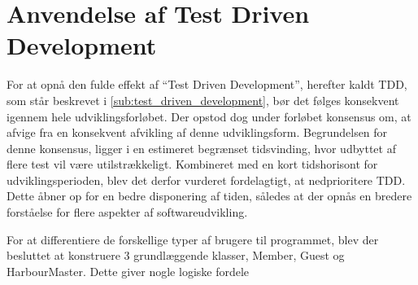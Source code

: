 \section{Anvendelse af Test Driven Development}

For at opnå den fulde effekt af \enquote{Test Driven Development}, herefter kaldt TDD, som står beskrevet i \cref{sub:test_driven_development}, bør det følges konsekvent igennem hele udviklingsforløbet. Der opstod dog under forløbet konsensus om, at afvige fra en konsekvent afvikling af denne udviklingsform. Begrundelsen for denne konsensus, ligger i en estimeret begrænset tidsvinding, hvor udbyttet af flere test vil være utilstrækkeligt. Kombineret med en kort tidshorisont for udviklingsperioden, blev det derfor vurderet fordelagtigt, at nedprioritere TDD. Dette åbner op for en bedre disponering af tiden, således at der opnås en bredere forståelse for flere aspekter af softwareudvikling.


For at differentiere de forskellige typer af brugere til programmet, blev der besluttet at konstruere 3 grundlæggende klasser, Member, Guest og HarbourMaster. Dette giver nogle logiske fordele
